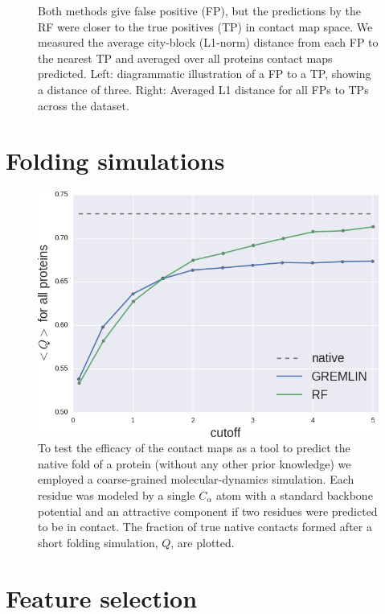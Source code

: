 \documentclass[landscape]{sciposter}
\newlength{\customfigheight}
\begin{document}
\begin{multicols}{3}
\begin{figure}
\caption{%
Both methods give false positive (FP), but the predictions by the RF were closer to the true positives (TP) in contact map space.
We measured the average city-block (L1-norm) distance from each FP to the nearest TP and averaged over all proteins contact maps predicted. 
Left: diagrammatic illustration of a FP to a TP, showing a distance of three. Right: Averaged L1 distance for all FPs to TPs across the dataset.
}
\end{figure}

\vfill \columnbreak

\section*{Folding simulations}
\begin{figure}
    \center 
    \includegraphics[height=1.25\customfigheight]{figures/folding/Q_avg.png}

\caption{
To test the efficacy of the contact maps as a tool to predict the native fold of a protein (without any other prior knowledge) we employed a coarse-grained molecular-dynamics simulation. 
Each residue was modeled by a single $C_\alpha$ atom with a standard backbone potential and an attractive component if two residues were predicted to be in contact.
The fraction of true native contacts formed after a short folding simulation, $Q$, are plotted.
}
\end{figure}


\vfill \columnbreak

\section*{Feature selection}


\end{multicols}
\end{document}

